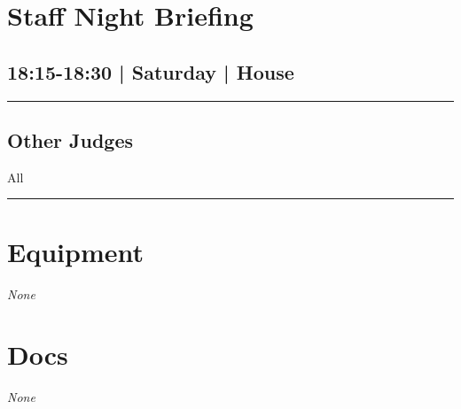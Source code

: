\documentclass[10pt, A5]{article}
\begin{document}
        \begin{framed}
        \begin{minipage}{\textwidth}

        \setcounter{section}{37}
        \section{Staff Night Briefing}
        \subsection*{18:15-18:30 | Saturday | House}

        \vspace{0.25cm}
        \hrule
        \vspace{0.25cm}


        \subsection*{Other Judges}
                    All

            \vspace{0.25cm}
        \hrule
        \vspace{0.25cm}

        \begin{multicols}{2}

		\section*{\faWrench \: Equipment}

				\textit{None}
		
		\vfill\null
		\columnbreak

			\section*{\faFile \: Docs}
		 	\textit{None}
	

		\vfill\null

		\end{multicols}
\end{minipage}
\end{framed}
\end{document}
